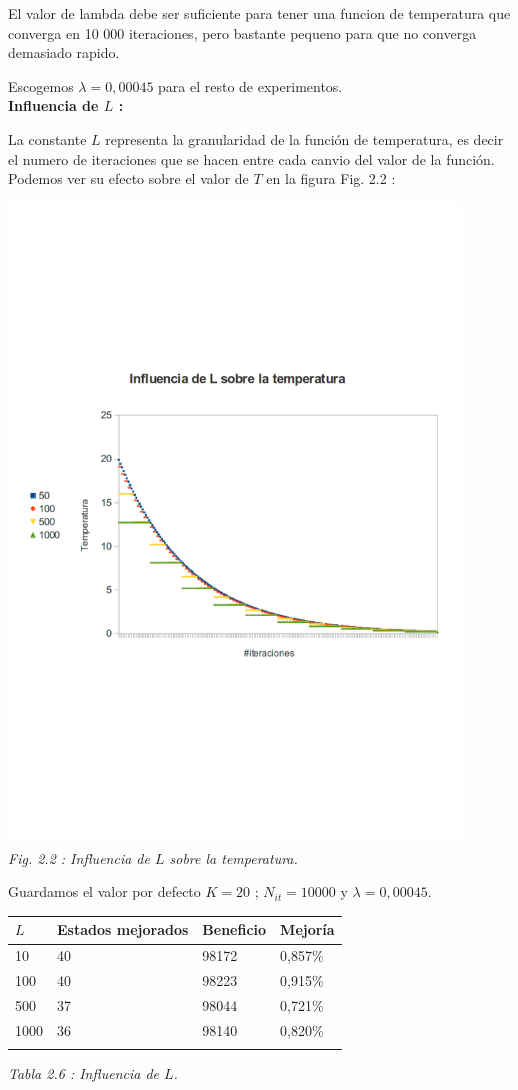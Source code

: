 \documentclass{article}
\begin{document}
El valor de lambda debe ser suficiente para tener una funcion de temperatura que
converga en 10 000 iteraciones, pero bastante pequeno para que no converga
demasiado rapido.

Escogemos $\lambda = 0,00045$ para el resto de experimentos.\\

\textbf{Influencia de $L$ : }

La constante $L$ representa la granularidad de la función de temperatura, es
decir el numero de iteraciones que se hacen entre cada canvio del valor de la
función. Podemos ver su efecto sobre el valor de $T$ en la figura Fig. 2.2 :
\begin{center}
\includegraphics[width=12cm]{L}\\
{\it Fig. 2.2 : Influencia de $L$ sobre la temperatura.}
\end{center}

Guardamos el valor por defecto $K=20$ ; $N_{it} = 10 000$ y $\lambda = 0,00045$.

\begin{center}
\begin{tabular}{|l||l|l|l|}
\hline
$L$ & Estados mejorados & Beneficio & Mejoría\\
\hline
10 & 40 & 98172 & 0,857\%\\
\hline
100 & 40 & 98223 & 0,915\%\\
\hline
500 & 37 & 98044 & 0,721\%\\
\hline
1000 & 36 & 98140 & 0,820\%\\
\hline\\
\end{tabular}
{\it Tabla 2.6 : Influencia de $L$.}
\end{center}
\end{document}
